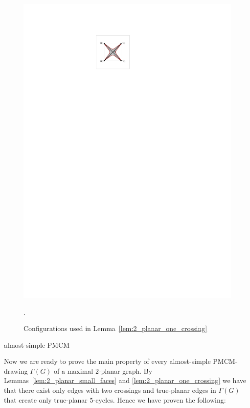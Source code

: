 \begin{figure}[htb]
\begin{minipage}[b]{.24\textwidth}
        \includegraphics[width=\textwidth,page=2]{images/2planar_one_crossing}
        \subcaption{~}\label{fig:2_planar_one_crossing_after}
    \end{minipage}
    \caption{%
    Configurations used in Lemma~\ref{lem:2_planar_one_crossing}}.
    \label{fig:2_planar_one_crossing}
\end{figure}

almost-simple PMCM
 
Now we are ready to prove the main property of every almost-simple PMCM-drawing $\Gamma(G)$ of a maximal $2$-planar graph. By Lemmas~\ref{lem:2_planar_small_faces} and \ref{lem:2_planar_one_crossing} we have that there exist only edges with two crossings and true-planar edges in $\Gamma(G)$ that create only true-planar $5$-cycles. Hence we have proven the following:
 

